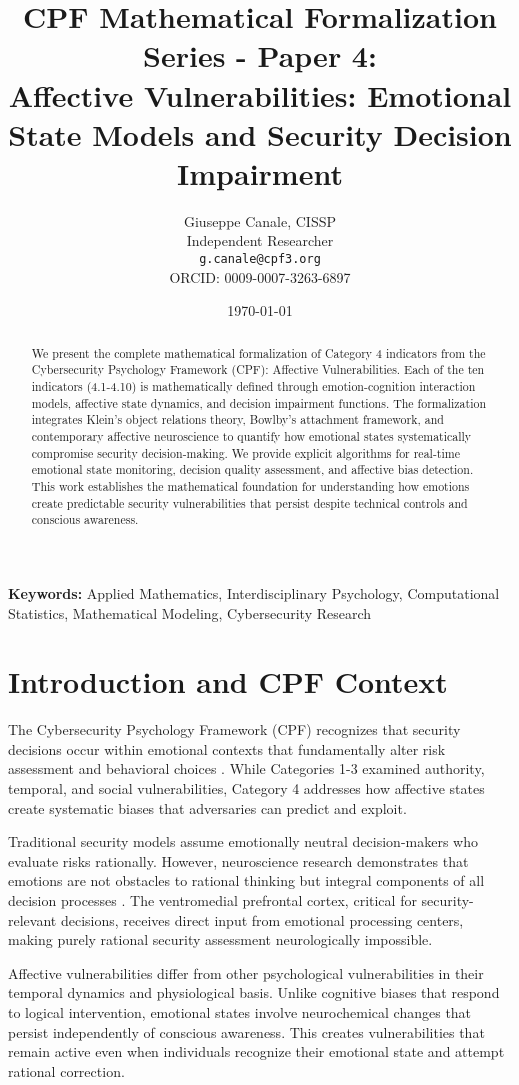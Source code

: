 \documentclass[11pt,a4paper]{article}
\title{CPF Mathematical Formalization Series - Paper 4:\\Affective Vulnerabilities: Emotional State Models and Security Decision Impairment}
\author{
    Giuseppe Canale, CISSP\\
    Independent Researcher\\
    \texttt{g.canale@cpf3.org}\\
    ORCID: 0009-0007-3263-6897
}
\date{\today}
\begin{document}
\maketitle

\begin{abstract}
We present the complete mathematical formalization of Category 4 indicators from the Cybersecurity Psychology Framework (CPF): Affective Vulnerabilities. Each of the ten indicators (4.1-4.10) is mathematically defined through emotion-cognition interaction models, affective state dynamics, and decision impairment functions. The formalization integrates Klein's object relations theory, Bowlby's attachment framework, and contemporary affective neuroscience to quantify how emotional states systematically compromise security decision-making. We provide explicit algorithms for real-time emotional state monitoring, decision quality assessment, and affective bias detection. This work establishes the mathematical foundation for understanding how emotions create predictable security vulnerabilities that persist despite technical controls and conscious awareness.
\end{abstract}

\textbf{Keywords:} Applied Mathematics, Interdisciplinary Psychology, Computational Statistics, Mathematical Modeling, Cybersecurity Research

\section{Introduction and CPF Context}

The Cybersecurity Psychology Framework (CPF) recognizes that security decisions occur within emotional contexts that fundamentally alter risk assessment and behavioral choices \cite{canale2024cpf}. While Categories 1-3 examined authority, temporal, and social vulnerabilities, Category 4 addresses how affective states create systematic biases that adversaries can predict and exploit.

Traditional security models assume emotionally neutral decision-makers who evaluate risks rationally. However, neuroscience research demonstrates that emotions are not obstacles to rational thinking but integral components of all decision processes \cite{damasio1994}. The ventromedial prefrontal cortex, critical for security-relevant decisions, receives direct input from emotional processing centers, making purely rational security assessment neurologically impossible.

Affective vulnerabilities differ from other psychological vulnerabilities in their temporal dynamics and physiological basis. Unlike cognitive biases that respond to logical intervention, emotional states involve neurochemical changes that persist independently of conscious awareness. This creates vulnerabilities that remain active even when individuals recognize their emotional state and attempt rational correction.
\end{document}
